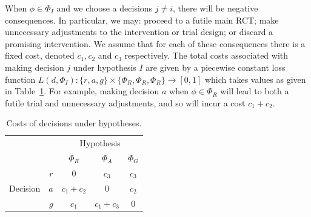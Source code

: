 \documentclass{article} %
\begin{document}
When $\phi \in \Phi_{I}$ and we choose a decisions $j \neq i$, there will be negative consequences. In particular, we may: proceed to a futile main RCT; make unnecessary adjustments to the intervention or trial design; or discard a promising intervention. We assume that for each of these consequences there is a fixed cost, denoted $c_1, c_2$ and $c_3$ respectively. The total costs associated with making decision $j$ under hypothesis $I$ are given by a piecewise constant loss function  $L(d, \Phi_{I}): \{r, a, g\} \times \{\Phi_{R}, \Phi_{R}, \Phi_{R}\} \rightarrow [0,1]$ which takes values as given in Table~\ref{tab:loss}. For example, making decision $a$ when $\phi \in \Phi_{R}$ will lead to both a futile trial and unnecessary adjustments, and so will incur a cost $c_{1} + c_{2}$.

\begin{table}
\centering
\begin{tabular}{r r c c c}
\toprule
& & \multicolumn{3}{c}{Hypothesis} \\
& & $\Phi_{R}$ & $\Phi_{A}$ & $\Phi_{G}$ \\
\midrule
\multirow{3}{*}{Decision} & $r$ & 0 & $c_{3}$ & $c_{3}$ \\
 & $a$ & $c_{1} + c_{2}$ & 0 & $c_{2}$ \\
 & $g$ & $c_{1}$ & $c_{1} + c_{3}$ & 0  \\
\bottomrule
\end{tabular}
\caption{Costs of decisions under hypotheses.}
\label{tab:loss}
\end{table}

\end{document}
